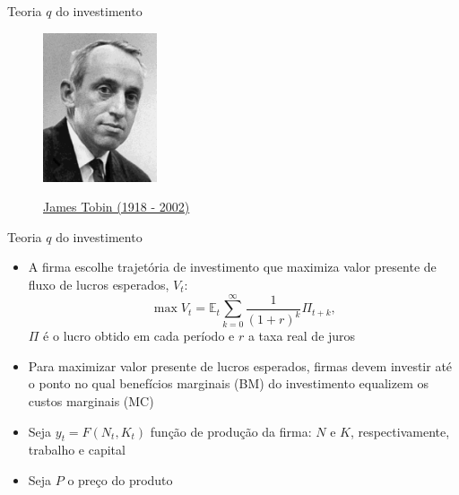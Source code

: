\documentclass[10pt]{beamer}
\begin{document}
\begin{frame}{Teoria $q$ do investimento}
    \begin{figure}
        \centering
        \href{https://en.wikipedia.org/wiki/James_Tobin}{\includegraphics[width=0.3\textwidth]{./figures/aula8_fig1.png}}
        \caption{\href{https://en.wikipedia.org/wiki/James_Tobin}{James Tobin (1918 - 2002)}}
    \end{figure}    
\end{frame}

\begin{frame}
    {Teoria $q$ do investimento}
    \begin{itemize}
        \item A firma escolhe trajetória de investimento que maximiza valor presente de fluxo de lucros esperados, $V_t$:
        \begin{equation}
            \max V_t = \mathbb{E}_t\sum_{k=0}^\infty \frac{1}{(1 + r)^k}\Pi_{t+k},
            \label{aula8_eq1}
        \end{equation}
        $\Pi$ é o lucro obtido em cada período e $r$ a taxa real de juros\bigskip
        \item Para maximizar valor presente de lucros esperados, firmas devem investir até o ponto no qual benefícios marginais (BM) do investimento equalizem os custos marginais (MC)\bigskip
        \item Seja $y_t = F(N_t, K_t)$ função de produção da firma: $N$ e $K$, respectivamente, trabalho e capital\bigskip
        \item Seja $P$ o preço do produto
    \end{itemize}
\end{frame}
\end{document}

